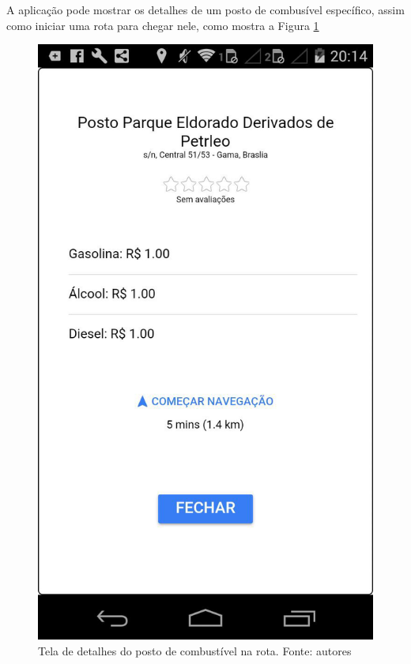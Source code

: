 A aplicação pode mostrar os detalhes de um posto de combusível específico, assim como iniciar uma rota para chegar nele, como mostra a Figura \ref{img:tela-detalhamento}

\begin{figure}[H]
    \centering
    \includegraphics[scale=0.3]{figuras/app_final_4.jpg}
    \caption[Tela de detalhes do posto de combustível na rota]{Tela de detalhes do posto de combustível na rota. Fonte: autores}
    \label{img:tela-detalhamento}
\end{figure}

